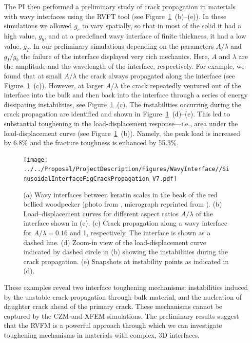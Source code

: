 \documentclass[10pt,letterpaper]{article}
\begin{document}
    The PI then performed a preliminary study of crack propagation in materials with wavy interfaces using the RVFT tool (see Figure~\ref{f:VFTprelimresults}~(b)--(e)).
    In these simulations we allowed $g_c$ to vary spatially, so that in most of the solid it had a high value, $g_{b}$, and at a predefined wavy interface of finite thickness, it had a low value, $g_{I}$.
    In our preliminary simulations depending on the parameters $A/\lambda$ and $g_{I}/g_{b}$ the failure of the interface displayed very rich mechanics.
    Here, $A$ and $\lambda$ are the amplitude and the wavelength of the interface, respectively.
    For example, we found that at small $A/\lambda$ the crack always propagated  along the interface (see Figure~\ref{f:VFTprelimresults}~(c)).
    However, at larger $A/\lambda$ the crack repeatedly ventured out of the interface into the bulk and then back into the interface through a series of energy dissipating instabilities, see Figure~\ref{f:VFTprelimresults}~(c).
    The instabilities occurring during the crack propagation are identified and shown in Figure~\ref{f:VFTprelimresults}~(d)--(e).
    This led to substantial toughening in the load-displacement response---i.e., area under the load-displacement curve (see Figure~\ref{f:VFTprelimresults}~(b)).
    Namely, the peak load is increased by 6.8\% and the fracture toughness is enhanced by 55.3\%.
    \begin{figure}[h]
      \texttt{[image: ../../Proposal/ProjectDescription/Figures/WavyInterface//SinusoidalInterfaceFigCrackPropagation\_V7.pdf]}
      \centering
      \caption{ \footnotesize (a) Wavy interfaces between keratin scales in the beak of the red bellied woodpecker (photo from \cite{birdpicture1}, micrograph reprinted from \cite{lee2014hierarchical}). (b) Load--displacement curves for different aspect ratios $A/\lambda$ of the interface shown in (c). (c) Crack propagation along a wavy interface for $A/\lambda = 0.16$ and 1, respectively. The interface is shown as a dashed line. (d) Zoom-in view of the load-displacement curve indicated by dashed circle in (b) showing the instabilities during the crack propagation. (e) Snapshots at instability points as indicated in (d).
      }
      \label{f:VFTprelimresults}
    \end{figure}

    These examples reveal two interface toughening mechanisms: instabilities induced by the unstable crack propagation through bulk material, and the nucleation of daughter crack ahead of the primary crack. These mechanisms cannot be captured by the CZM and XFEM simulations. The preliminary results suggest that the RVFM is a powerful approach through which we can investigate toughening mechanisms in materials with complex, 3D interfaces.
\end{document}
